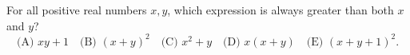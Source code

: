 For all positive real numbers $x,y$, which expression is always greater than both $x$ and $y$?
\[
\text{(A) }xy+1\quad
\text{(B) }(x+y)^2\quad
\text{(C) }x^2+y\quad
\text{(D) }x(x+y)\quad
\text{(E) }(x+y+1)^2.
\]
